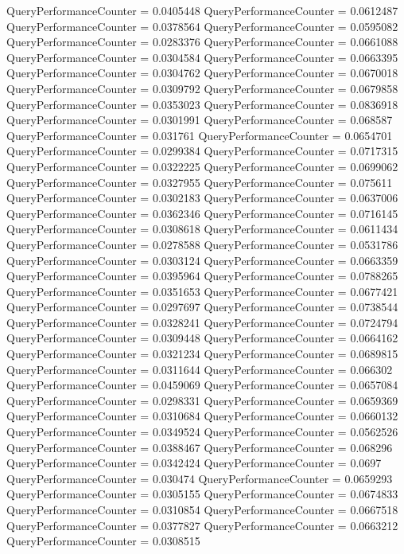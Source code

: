 \documentclass[9pt]{article}
\theoremstyle{plain}
\theoremstyle{definition}
\theoremstyle{remark}
\numberwithin{equation}{section}
\begin{document}
QueryPerformanceCounter  =  0.0405448
QueryPerformanceCounter  =  0.0612487
QueryPerformanceCounter  =  0.0378564
QueryPerformanceCounter  =  0.0595082
QueryPerformanceCounter  =  0.0283376
QueryPerformanceCounter  =  0.0661088
QueryPerformanceCounter  =  0.0304584
QueryPerformanceCounter  =  0.0663395
QueryPerformanceCounter  =  0.0304762
QueryPerformanceCounter  =  0.0670018
QueryPerformanceCounter  =  0.0309792
QueryPerformanceCounter  =  0.0679858
QueryPerformanceCounter  =  0.0353023
QueryPerformanceCounter  =  0.0836918
QueryPerformanceCounter  =  0.0301991
QueryPerformanceCounter  =  0.068587
QueryPerformanceCounter  =  0.031761
QueryPerformanceCounter  =  0.0654701
QueryPerformanceCounter  =  0.0299384
QueryPerformanceCounter  =  0.0717315
QueryPerformanceCounter  =  0.0322225
QueryPerformanceCounter  =  0.0699062
QueryPerformanceCounter  =  0.0327955
QueryPerformanceCounter  =  0.075611
QueryPerformanceCounter  =  0.0302183
QueryPerformanceCounter  =  0.0637006
QueryPerformanceCounter  =  0.0362346
QueryPerformanceCounter  =  0.0716145
QueryPerformanceCounter  =  0.0308618
QueryPerformanceCounter  =  0.0611434
QueryPerformanceCounter  =  0.0278588
QueryPerformanceCounter  =  0.0531786
QueryPerformanceCounter  =  0.0303124
QueryPerformanceCounter  =  0.0663359
QueryPerformanceCounter  =  0.0395964
QueryPerformanceCounter  =  0.0788265
QueryPerformanceCounter  =  0.0351653
QueryPerformanceCounter  =  0.0677421
QueryPerformanceCounter  =  0.0297697
QueryPerformanceCounter  =  0.0738544
QueryPerformanceCounter  =  0.0328241
QueryPerformanceCounter  =  0.0724794
QueryPerformanceCounter  =  0.0309448
QueryPerformanceCounter  =  0.0664162
QueryPerformanceCounter  =  0.0321234
QueryPerformanceCounter  =  0.0689815
QueryPerformanceCounter  =  0.0311644
QueryPerformanceCounter  =  0.066302
QueryPerformanceCounter  =  0.0459069
QueryPerformanceCounter  =  0.0657084
QueryPerformanceCounter  =  0.0298331
QueryPerformanceCounter  =  0.0659369
QueryPerformanceCounter  =  0.0310684
QueryPerformanceCounter  =  0.0660132
QueryPerformanceCounter  =  0.0349524
QueryPerformanceCounter  =  0.0562526
QueryPerformanceCounter  =  0.0388467
QueryPerformanceCounter  =  0.068296
QueryPerformanceCounter  =  0.0342424
QueryPerformanceCounter  =  0.0697
QueryPerformanceCounter  =  0.030474
QueryPerformanceCounter  =  0.0659293
QueryPerformanceCounter  =  0.0305155
QueryPerformanceCounter  =  0.0674833
QueryPerformanceCounter  =  0.0310854
QueryPerformanceCounter  =  0.0667518
QueryPerformanceCounter  =  0.0377827
QueryPerformanceCounter  =  0.0663212
QueryPerformanceCounter  =  0.0308515
\end{document}
